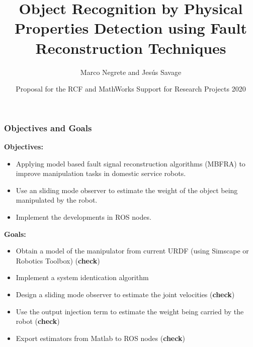 \documentclass[9pt,spanish,aspectratio=1610]{beamer}
\begin{document}
\renewcommand{\tablename}{Tabla}
\renewcommand{\figurename}{Figura}

\title[Object Recognition using Fault Reconstruction Techniques]{Object Recognition by Physical Properties Detection using Fault Reconstruction Techniques}
\author[Marco Negrete and Jesús Savage]{Marco Negrete and Jesús Savage}
\date[RFC-MathWorks Support for Research Projects 2020]{Proposal for the RCF and MathWorks Support for Research Projects 2020}

\begin{frame}
\titlepage
\end{frame}

\begin{frame}\frametitle{Objectives and Goals}
  \textbf{Objectives:}
  \begin{itemize}
  \item Applying model based fault signal reconstruction algorithms (MBFRA) to improve manipulation tasks in domestic service robots.
  \item Use an sliding mode observer to estimate the weight of the object being manipulated by the robot.
  \item Implement the developments in ROS nodes.
  \end{itemize}

  \textbf{Goals:}
  \begin{itemize}
  \item Obtain a model of the manipulator from current URDF (using Simscape or Robotics Toolbox) (\textbf{check})
  \item Implement a system identication algorithm 
  \item Design a sliding mode observer to estimate the joint velocities (\textbf{check})
  \item Use the output injection term to estimate the weight being carried by the robot (\textbf{check})
  \item Export estimators from Matlab to ROS nodes (\textbf{check})
  \end{itemize}
\end{frame}
\end{document}
